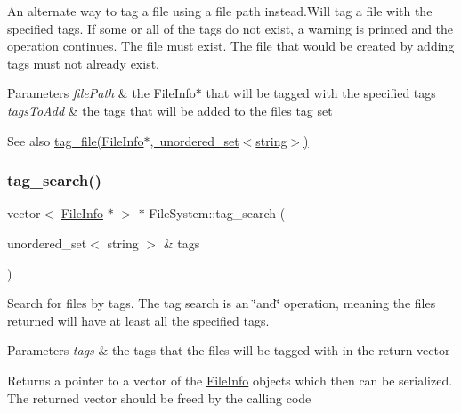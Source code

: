 An alternate way to tag a file using a file path instead.\+Will tag a file with the specified tags. If some or all of the tags do not exist, a warning is printed and the operation continues. The file must exist. The file that would be created by adding tags must not already exist. 
\begin{DoxyParams}{Parameters}
{\em file\+Path} & the File\+Info$\ast$ that will be tagged with the specified tags \\
\hline
{\em tags\+To\+Add} & the tags that will be added to the file\textquotesingle{}s tag set \\
\hline
\end{DoxyParams}
\begin{DoxySeeAlso}{See also}
\mbox{\hyperlink{classFileSystem_a33649a9100b30978db80654ece6504f4}{tag\+\_\+file(\+File\+Info$\ast$, unordered\+\_\+set$<$string$>$)}} 
\end{DoxySeeAlso}
\mbox{\label{classFileSystem_afb76c092b6ab19c9609e1707e5bdfe1b}} 
\subsubsection{\texorpdfstring{tag\+\_\+search()}{tag\_search()}}
{\footnotesize\ttfamily vector$<$ \mbox{\hyperlink{classFileInfo}{File\+Info}} $\ast$ $>$ $\ast$ File\+System\+::tag\+\_\+search (\begin{DoxyParamCaption}\item[{unordered\+\_\+set$<$ string $>$ \&}]{tags }\end{DoxyParamCaption})}

Search for files by tags. The tag search is an \char`\"{}and\char`\"{} operation, meaning the files returned will have at least all the specified tags. 
\begin{DoxyParams}{Parameters}
{\em tags} & the tags that the files will be tagged with in the return vector \\
\hline
\end{DoxyParams}
\begin{DoxyReturn}{Returns}
a pointer to a vector of the \mbox{\hyperlink{classFileInfo}{File\+Info}} objects which then can be serialized. The returned vector should be freed by the calling code 
\end{DoxyReturn}
\mbox{\label{classFileSystem_ac41a4071cfd0f4470f606e24c04740b7}} 

